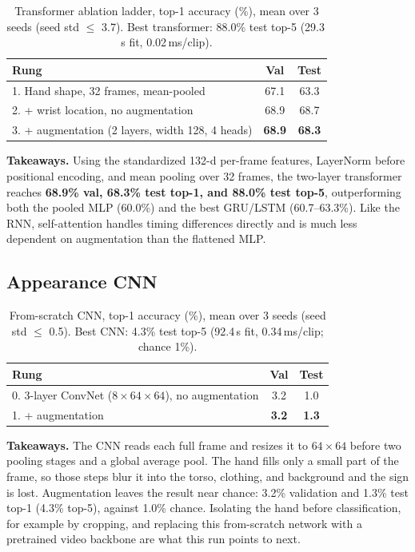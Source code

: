 \documentclass[10pt]{article}
\begin{document}
\begin{table}[h]
\centering\footnotesize
\begin{tabular}{lcc}
\toprule
Rung & Val & Test \\
\midrule
1. Hand shape, 32 frames, mean-pooled & 67.1 & 63.3 \\
2. + wrist location, no augmentation  & 68.9 & 68.7 \\
3. + augmentation (2 layers, width 128, 4 heads) & \textbf{68.9} & \textbf{68.3} \\
\bottomrule
\end{tabular}
\caption{Transformer ablation ladder, top-1 accuracy (\%), mean over 3 seeds (seed std $\le$ 3.7). Best transformer: 88.0\% test top-5 (29.3\,s fit, 0.02\,ms/clip).}
\label{tab:transformer}
\end{table}

\textbf{Takeaways.} Using the standardized 132-d per-frame features, LayerNorm before positional encoding, and mean pooling over 32 frames, the two-layer transformer reaches \textbf{68.9\% val, 68.3\% test top-1, and 88.0\% test top-5}, outperforming both the pooled MLP (60.0\%) and the best GRU/LSTM (60.7--63.3\%). Like the RNN, self-attention handles timing differences directly and is much less dependent on augmentation than the flattened MLP.

\subsection{Appearance CNN}\label{sec:cnn}

\begin{table}[h]
\centering\footnotesize
\begin{tabular}{lcc}
\toprule
Rung & Val & Test \\
\midrule
0. 3-layer ConvNet ($8\times64\times64$), no augmentation & 3.2 & 1.0 \\
1. + augmentation & \textbf{3.2} & \textbf{1.3} \\
\bottomrule
\end{tabular}
\caption{From-scratch CNN, top-1 accuracy (\%), mean over 3 seeds (seed std $\le$ 0.5). Best CNN: 4.3\% test top-5 (92.4\,s fit, 0.34\,ms/clip; chance 1\%).}
\label{tab:cnn}
\end{table}

\textbf{Takeaways.} The CNN reads each full frame and resizes it to $64\times64$ before two pooling stages and a global average pool. The hand fills only a small part of the frame, so those steps blur it into the torso, clothing, and background and the sign is lost. Augmentation leaves the result near chance: 3.2\% validation and 1.3\% test top-1 (4.3\% top-5), against 1.0\% chance. Isolating the hand before classification, for example by cropping, and replacing this from-scratch network with a pretrained video backbone are what this run points to next.
\end{document}
